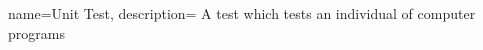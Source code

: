 {  
    name={Unit Test},
    description={
        A test which tests an individual of computer programs
    }
}